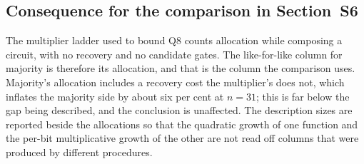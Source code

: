 \documentclass[11pt,a4paper]{article}
\begin{document}
\subsection{Consequence for the comparison in Section~S6}

The multiplier ladder used to bound Q8 counts allocation while composing a
circuit, with no recovery and no candidate gates. The like-for-like column for
majority is therefore its allocation, and that is the column the comparison
uses. Majority's allocation includes a recovery cost the multiplier's does not,
which inflates the majority side by about six per cent at $n=31$; this is far
below the gap being described, and the conclusion is unaffected. The
description sizes are reported beside the allocations so that the quadratic
growth of one function and the per-bit multiplicative growth of the other are
not read off columns that were produced by different procedures.
\end{document}
